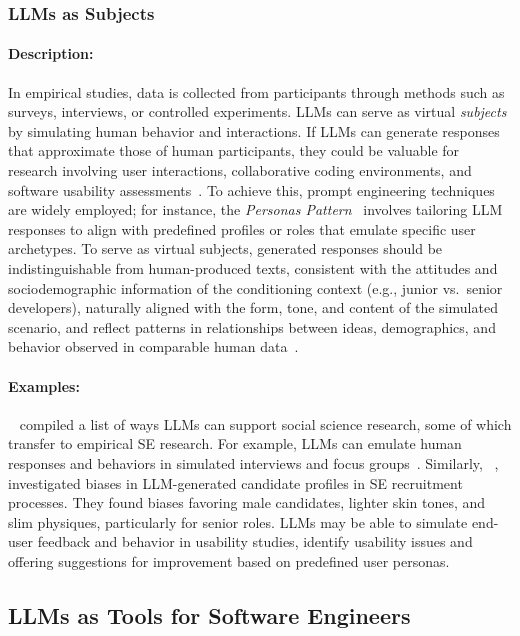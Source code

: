 \documentclass[smallextended]{svjour3}
\newcommand{\studytypesubsection}[1]{\subsubsection{#1}}
\newcommand{\studytypeparagraph}[1]{\paragraph{\bfseries #1:}}
\newcommand{\studytypesubsection}[1]{\subsection{#1}}
\newcommand{\studytypeparagraph}[1]{\subsubsection{#1}}
\begin{document}
\studytypesubsection{LLMs as Subjects}
\label{sec:llms-as-subjects}

\studytypeparagraph{Description}

In empirical studies, data is collected from participants through methods such as surveys, interviews, or controlled experiments.
LLMs can serve as virtual \emph{subjects} by simulating human behavior and interactions. If LLMs can generate responses that approximate those of human participants, they could be valuable for research involving user interactions, collaborative coding environments, and software usability assessments~\cite{ZHAO2025101167}.
To achieve this, prompt engineering techniques are widely employed; for instance, the \textit{Personas Pattern}~\cite{DBLP:conf/naacl/KongZCLQSZWD24} involves tailoring LLM responses to align with predefined profiles or roles that emulate specific user archetypes.
To serve as virtual subjects, generated responses should be indistinguishable from human-produced texts, consistent with the attitudes and sociodemographic information of the conditioning context (e.g., junior vs.\ senior developers), naturally aligned with the form, tone, and content of the simulated scenario, and reflect patterns in relationships between ideas, demographics, and behavior observed in comparable human data~\cite{DBLP:journals/corr/abs-2209-06899}.

\studytypeparagraph{Examples}

\citeauthor{DBLP:journals/ipm/XuSRGPLSH24}~\cite{DBLP:journals/ipm/XuSRGPLSH24} compiled a list of ways LLMs can support social science research, some of which transfer to empirical SE research. For example, LLMs can emulate human responses and behaviors in simulated interviews and focus groups~\cite{DBLP:journals/ase/GerosaTSS24}. Similarly, \citeauthor{DBLP:conf/icse/BanoGH25}~\cite{DBLP:conf/icse/BanoGH25}, investigated biases in LLM-generated candidate profiles in SE recruitment processes. They found biases favoring male candidates, lighter skin tones, and slim physiques, particularly for senior roles. LLMs may be able to simulate end-user feedback and behavior in usability studies, identify usability issues and offering suggestions for improvement based on predefined user personas.
 
\subsection{LLMs as Tools for Software Engineers}
\label{sec:llms-as-tools-for-software-engineers}
\end{document}
